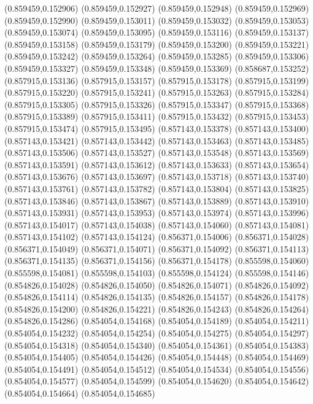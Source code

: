 (0.859459,0.152906)
(0.859459,0.152927)
(0.859459,0.152948)
(0.859459,0.152969)
(0.859459,0.152990)
(0.859459,0.153011)
(0.859459,0.153032)
(0.859459,0.153053)
(0.859459,0.153074)
(0.859459,0.153095)
(0.859459,0.153116)
(0.859459,0.153137)
(0.859459,0.153158)
(0.859459,0.153179)
(0.859459,0.153200)
(0.859459,0.153221)
(0.859459,0.153242)
(0.859459,0.153264)
(0.859459,0.153285)
(0.859459,0.153306)
(0.859459,0.153327)
(0.859459,0.153348)
(0.859459,0.153369)
(0.858687,0.153252)
(0.857915,0.153136)
(0.857915,0.153157)
(0.857915,0.153178)
(0.857915,0.153199)
(0.857915,0.153220)
(0.857915,0.153241)
(0.857915,0.153263)
(0.857915,0.153284)
(0.857915,0.153305)
(0.857915,0.153326)
(0.857915,0.153347)
(0.857915,0.153368)
(0.857915,0.153389)
(0.857915,0.153411)
(0.857915,0.153432)
(0.857915,0.153453)
(0.857915,0.153474)
(0.857915,0.153495)
(0.857143,0.153378)
(0.857143,0.153400)
(0.857143,0.153421)
(0.857143,0.153442)
(0.857143,0.153463)
(0.857143,0.153485)
(0.857143,0.153506)
(0.857143,0.153527)
(0.857143,0.153548)
(0.857143,0.153569)
(0.857143,0.153591)
(0.857143,0.153612)
(0.857143,0.153633)
(0.857143,0.153654)
(0.857143,0.153676)
(0.857143,0.153697)
(0.857143,0.153718)
(0.857143,0.153740)
(0.857143,0.153761)
(0.857143,0.153782)
(0.857143,0.153804)
(0.857143,0.153825)
(0.857143,0.153846)
(0.857143,0.153867)
(0.857143,0.153889)
(0.857143,0.153910)
(0.857143,0.153931)
(0.857143,0.153953)
(0.857143,0.153974)
(0.857143,0.153996)
(0.857143,0.154017)
(0.857143,0.154038)
(0.857143,0.154060)
(0.857143,0.154081)
(0.857143,0.154102)
(0.857143,0.154124)
(0.856371,0.154006)
(0.856371,0.154028)
(0.856371,0.154049)
(0.856371,0.154071)
(0.856371,0.154092)
(0.856371,0.154113)
(0.856371,0.154135)
(0.856371,0.154156)
(0.856371,0.154178)
(0.855598,0.154060)
(0.855598,0.154081)
(0.855598,0.154103)
(0.855598,0.154124)
(0.855598,0.154146)
(0.854826,0.154028)
(0.854826,0.154050)
(0.854826,0.154071)
(0.854826,0.154092)
(0.854826,0.154114)
(0.854826,0.154135)
(0.854826,0.154157)
(0.854826,0.154178)
(0.854826,0.154200)
(0.854826,0.154221)
(0.854826,0.154243)
(0.854826,0.154264)
(0.854826,0.154286)
(0.854054,0.154168)
(0.854054,0.154189)
(0.854054,0.154211)
(0.854054,0.154232)
(0.854054,0.154254)
(0.854054,0.154275)
(0.854054,0.154297)
(0.854054,0.154318)
(0.854054,0.154340)
(0.854054,0.154361)
(0.854054,0.154383)
(0.854054,0.154405)
(0.854054,0.154426)
(0.854054,0.154448)
(0.854054,0.154469)
(0.854054,0.154491)
(0.854054,0.154512)
(0.854054,0.154534)
(0.854054,0.154556)
(0.854054,0.154577)
(0.854054,0.154599)
(0.854054,0.154620)
(0.854054,0.154642)
(0.854054,0.154664)
(0.854054,0.154685)
